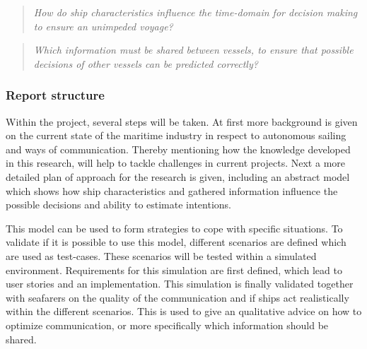 \begin{quotation}
	\emph{How do ship characteristics influence the time-domain for decision making to ensure an unimpeded voyage?} 
\end{quotation}

\begin{quotation}
	\emph{Which information must be shared between vessels, to ensure that possible decisions of other vessels can be predicted correctly?}
\end{quotation}

\subsubsection*{Report structure}
Within the project, several steps will be taken. At first more background is given on the current state of the maritime industry in respect to autonomous sailing and ways of communication. Thereby mentioning how the knowledge developed in this research, will help to tackle challenges in current projects.
Next a more detailed plan of approach for the research is given, including an abstract model which shows how ship characteristics and gathered information influence the possible decisions and ability to estimate intentions.

This model can be used to form strategies to cope with specific situations. To validate if it is possible to use this model, different scenarios are defined which are used as test-cases. These scenarios will be tested within a simulated environment. Requirements for this simulation are first defined, which lead to user stories and an implementation.
This simulation is finally validated together with seafarers on the quality of the communication and if ships act realistically within the different scenarios. This is used to give an qualitative advice on how to optimize communication, or more specifically which information should be shared.
